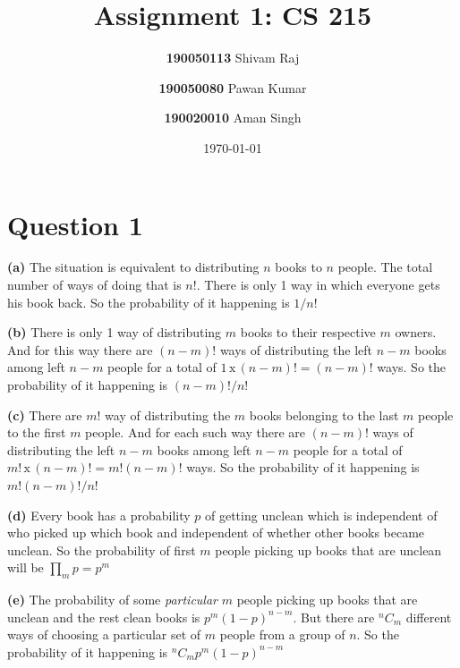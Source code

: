 \documentclass{article}
\title{Assignment 1: CS 215}
\author{
  \textbf{190050113} Shivam Raj
  \and
  \textbf{190050080} Pawan Kumar
  \and
  \textbf{190020010} Aman Singh
}
\date{\today}
\theoremstyle{remark}
\begin{document}
\maketitle
\tableofcontents

\newpage
{}

\section{Question 1}
\textbf{(a)} The situation is equivalent to distributing $n$ books to $n$ people. The total number of ways of doing that is $n!$. There is only 1 way in which everyone gets his book back. So the probability of it happening is $\boxed{1/n!}$ \par

\textbf{(b)} There is only 1 way of distributing $m$ books to their respective $m$ owners. And for this way there are $(n-m)!$ ways of distributing the left $n-m$ books among left $n-m$ people for a total of $1\,\text{x}\,(n-m)!=(n-m)!$ ways. So the probability of it happening is $\boxed{(n-m)!/n!}$ \par

\textbf{(c)} There are $m!$ way of distributing the $m$ books belonging to the last $m$ people to the first $m$ people. And for each such way there are $(n-m)!$ ways of distributing the left $n-m$ books among left $n-m$ people for a total of $m!\,\text{x}\,(n-m)!=m!(n-m)!$ ways. So the probability of it happening is $\boxed{m!(n-m)!/n!}$ \par

\textbf{(d)} Every book has a probability $p$ of getting unclean which is independent of who picked up which book and independent of whether other books became unclean. So the probability of first $m$ people picking up books that are unclean will be $\prod_m p = \boxed{p^m}$ \par

\textbf{(e)} The probability of some \textit{particular} $m$ people picking up books that are unclean and the rest clean books is $p^m(1-p)^{n-m}$. But there are ${}^n C_m$ different ways of choosing a particular set of $m$ people from a group of $n$. So the probability of it happening is $\boxed{{}^n C_m p^m(1-p)^{n-m}}$\par
\end{document}
